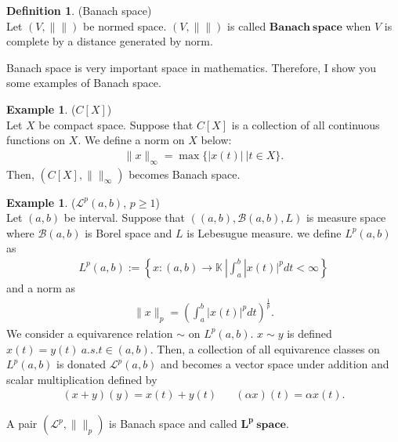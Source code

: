 \documentclass[11pt, a4paper, english, dvipdfmx]{jsarticle}
\theoremstyle{definition}
\newtheorem{Definition+}[Axiom+]{Definition}
\newtheorem{Example+}[Axiom+]{Example}
\newcommand{\K}{\mathbb{K}}
\begin{document}
\begin{Definition+}(Banach space)\\
    Let $(V, \|\|)$ be normed space. 
    $(V, \|\|)$ is called $\mathbf{Banach~space}$ when $V$ is complete by a distance generated by norm.
\end{Definition+}
Banach space is very important space in mathematics. 
Therefore, I show you some examples of Banach space.
\begin{Example+}($C[X]$)\\
    Let $X$ be compact space. Suppose that $C[X]$ is a collection of all continuous functions on $X$.
    We define a norm on $X$ below:
    \begin{align*}
        \|x\|_{\infty} = \max\{|x(t)|~|t\in X\}.
    \end{align*}
    Then, $(C[X],\|\|_{\infty})$ becomes Banach space.
\end{Example+}
\begin{Example+}($\mathcal{L}^p(a, b)$, $p\geq 1$)\\
    Let $(a, b)$ be interval. Suppose that $((a, b), \mathcal{B}(a, b), L)$ is 
    measure space where $\mathcal{B}(a, b)$ is Borel space and $L$ is Lebesugue measure. we define $L^{p}(a, b)$ as
    \begin{align*}
        L^p(a, b) := \left\{x:(a, b)\to\K~|\int_{a}^{b}|x(t)|^{p}dt < \infty\right\}
    \end{align*} 
    and a norm as
    \begin{align*}
        \|x\|_{p} = \left(\int_{a}^{b}|x(t)|^{p}dt\right)^{\frac{1}{p}}.
    \end{align*}
    We consider a equivarence relation $\sim$ on $L^{p}(a, b)$. $x\sim y$ is defined 
    $x(t) = y(t)~a.s.t\in (a, b)$. Then, a collection of all equivarence classes on $L^{p}(a, b)$ is donated 
    $\mathcal{L}^{p}(a, b)$ and becomes a vector space under addition and scalar multiplication defined by
    \begin{align*}
        (x + y)(y) = x(t) + y(t)\hspace{20pt}(\alpha x)(t) = \alpha x(t).
    \end{align*}

    A pair $(\mathcal{L}^{p}, \|\|_{p})$ is Banach space and called $\mathbf{L^{p}~space}$.
\end{Example+}
\end{document}
